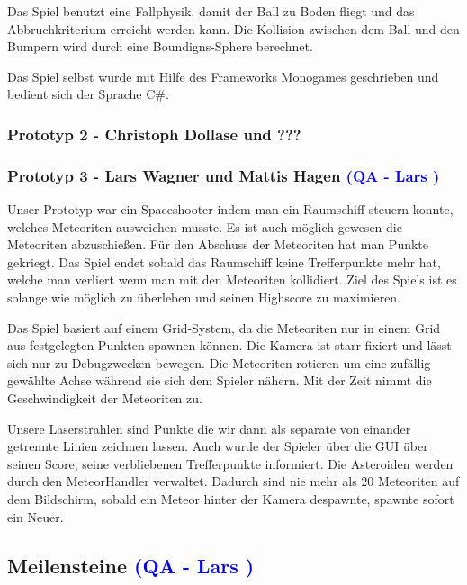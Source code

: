 \documentclass[12pt]{article}
\begin{document}
Das Spiel benutzt eine Fallphysik, damit der Ball zu Boden fliegt und das Abbruchkriterium erreicht werden kann. Die Kollision
zwischen dem Ball und den Bumpern wird durch eine Boundigns-Sphere berechnet.

Das Spiel selbst wurde mit Hilfe des Frameworks Monogames geschrieben und bedient sich der Sprache C\#.

\vspace{1cm}
\subsubsection{Prototyp 2 - Christoph Dollase und ???}

\vspace{1cm}
\subsubsection{Prototyp 3 - Lars Wagner und Mattis Hagen \textcolor{blue}{(QA - Lars )}}
Unser Prototyp war ein Spaceshooter indem man ein Raumschiff steuern konnte, welches Meteoriten ausweichen musste.
Es ist auch möglich gewesen die Meteoriten abzuschießen. Für den Abschuss der Meteoriten hat man Punkte gekriegt. Das Spiel endet
sobald das Raumschiff keine Trefferpunkte mehr hat, welche man verliert wenn man mit den Meteoriten kollidiert. Ziel des Spiels ist es
solange wie möglich zu überleben und seinen Highscore zu maximieren.

\noindent Das Spiel basiert auf einem Grid-System, da die Meteoriten nur in einem Grid aus festgelegten Punkten spawnen können. Die
Kamera ist starr fixiert und lässt sich nur zu Debugzwecken bewegen. Die Meteoriten rotieren um eine zufällig gewählte Achse während
sie sich dem Spieler nähern. Mit der Zeit nimmt die Geschwindigkeit der Meteoriten zu.\newline\newline

Unsere Laserstrahlen sind Punkte die wir dann als separate von einander getrennte Linien zeichnen lassen.
Auch wurde der Spieler über die GUI über seinen Score, seine verbliebenen Trefferpunkte informiert.
Die Asteroiden werden durch den MeteorHandler verwaltet. Dadurch sind nie mehr als 20 Meteoriten auf dem Bildschirm, sobald ein Meteor
hinter der Kamera despawnte, spawnte sofort ein Neuer.

\vspace{2cm}
\subsection{Meilensteine \textcolor{blue}{(QA - Lars )}}
\end{document}

